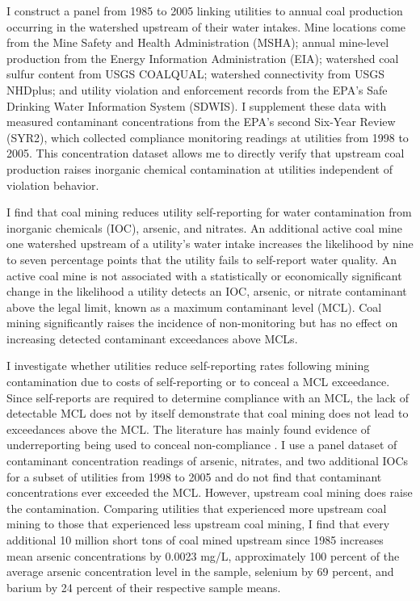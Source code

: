 \documentclass{article}
\begin{document}
I construct a panel from 1985 to 2005 linking utilities to annual coal production occurring in the watershed upstream of their water intakes. Mine locations come from the Mine Safety and Health Administration (MSHA); annual mine-level production from the Energy Information Administration (EIA); watershed coal sulfur content from USGS COALQUAL; watershed connectivity from USGS NHDplus; and utility violation and enforcement records from the EPA's Safe Drinking Water Information System (SDWIS). I supplement these data with measured contaminant concentrations from the EPA's second Six-Year Review (SYR2), which collected compliance monitoring readings at utilities from 1998 to 2005. This concentration dataset allows me to directly verify that upstream coal production raises inorganic chemical contamination at utilities independent of violation behavior.

I find that coal mining reduces utility self-reporting for water contamination from inorganic chemicals (IOC), arsenic, and nitrates. An additional active coal mine one watershed upstream of a utility's water intake increases the likelihood by nine to seven percentage points that the utility fails to self-report water quality. An active coal mine is not associated with a statistically or economically significant change in the likelihood a utility detects an IOC, arsenic, or nitrate contaminant above the legal limit, known as a maximum contaminant level (MCL). Coal mining significantly raises the incidence of non-monitoring but has no effect on increasing detected contaminant exceedances above MCLs.

I investigate whether utilities reduce self-reporting rates following mining contamination due to costs of self-reporting or to conceal a MCL exceedance. Since self-reports are required to determine compliance with an MCL, the lack of detectable MCL does not by itself demonstrate that coal mining does not lead to exceedances above the MCL. The literature has mainly found evidence of underreporting being used to conceal non-compliance \parencite{wallsten2008effects, foster2019arsenic, zou2021unwatched, 10.1162/rest_a_01477}. I use a panel dataset of contaminant concentration readings of arsenic, nitrates, and two additional IOCs for a subset of utilities from 1998 to 2005 and do not find that contaminant concentrations ever exceeded the MCL. However, upstream coal mining does raise the contamination. Comparing utilities that experienced more upstream coal mining to those that experienced less upstream coal mining, I find that every additional 10 million short tons of coal mined upstream since 1985 increases mean arsenic concentrations by 0.0023 mg/L, approximately 100 percent of the average arsenic concentration level in the sample, selenium by 69 percent, and barium by 24 percent of their respective sample means.
\end{document}
